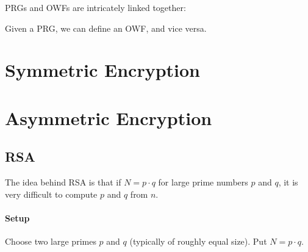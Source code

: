 PRGs and OWFs are intricately linked together:
\begin{theorem}
Given a PRG, we can define an OWF, and vice versa.
\end{theorem}

%

\section{Symmetric Encryption}\label{sec:sd:crypto:sym}


\section{Asymmetric Encryption}\label{sec:sd:crypto:asym}

\subsection{RSA}

The idea behind RSA is that if $N=p\cdot q$ for large prime numbers $p$ and $q$, it is very difficult to compute $p$ and $q$ from $n$.

\paragraph{Setup}
Choose two large primes $p$ and $q$ (typically of roughly equal size).
Put $N=p\cdot q$.

